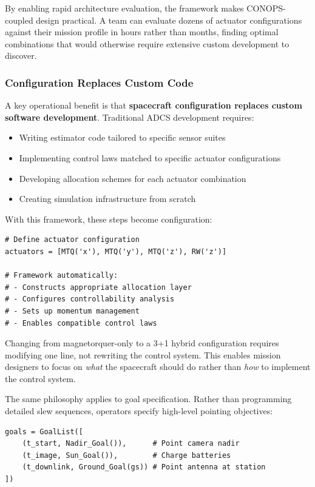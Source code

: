 \documentclass[conference]{IEEEtran}
\begin{document}
By enabling rapid architecture evaluation, the framework makes CONOPS-coupled design practical. A team can evaluate dozens of actuator configurations against their mission profile in hours rather than months, finding optimal combinations that would otherwise require extensive custom development to discover.

\subsubsection{Configuration Replaces Custom Code}

A key operational benefit is that \textbf{spacecraft configuration replaces custom software development}. Traditional ADCS development requires:
\begin{itemize}
    \item Writing estimator code tailored to specific sensor suites
    \item Implementing control laws matched to specific actuator configurations
    \item Developing allocation schemes for each actuator combination
    \item Creating simulation infrastructure from scratch
\end{itemize}

With this framework, these steps become configuration:
\begin{lstlisting}[caption={Configuration-based spacecraft definition}]
# Define actuator configuration
actuators = [MTQ('x'), MTQ('y'), MTQ('z'), RW('z')]

# Framework automatically:
# - Constructs appropriate allocation layer
# - Configures controllability analysis
# - Sets up momentum management
# - Enables compatible control laws
\end{lstlisting}

Changing from magnetorquer-only to a 3+1 hybrid configuration requires modifying one line, not rewriting the control system. This enables mission designers to focus on \emph{what} the spacecraft should do rather than \emph{how} to implement the control system.

The same philosophy applies to goal specification. Rather than programming detailed slew sequences, operators specify high-level pointing objectives:
\begin{lstlisting}[caption={Goal-based operation}]
goals = GoalList([
    (t_start, Nadir_Goal()),      # Point camera nadir
    (t_image, Sun_Goal()),        # Charge batteries
    (t_downlink, Ground_Goal(gs)) # Point antenna at station
])
\end{lstlisting}
\end{document}
